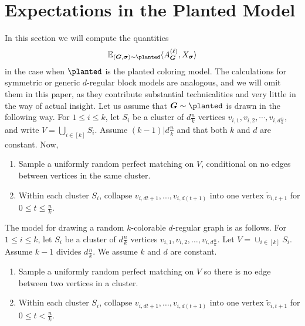 
\newcommand{\Proj}[1]{\Pi_{#1}}
\newcommand{\Symm}[1]{\mathsf{Symm}\left(#1\right)}
\newcommand{\rank}{\mathsf{rank}}


\section{Expectations in the Planted Model} \label{sec:exp-calc}

In this section we will compute the quantities
$$
    \bbE_{(\bG,\bm \sigma) \sim \planted} \langle \nb{\ell}{\bG}, X_{\bm \sigma} \rangle
$$
in the case when $\planted$ is the planted coloring model. The calculations for symmetric or generic $d$-regular block models are analogous, and we will omit them in this paper, as they contribute substantial technicalities and very little in the way of actual insight. Let us assume that $\bG \sim \planted$ is drawn in the following way. For $1 \le i \le k$, let $S_i$ be a cluster of $d\frac{n}{k}$ vertices $v_{i,1},v_{i,2},\cdots,v_{i,d\frac{n}{k}}$, and write $V = \bigcup_{i\in [k]} S_i$. Assume $(k-1)|d\frac{n}{k}$ and that both $k$ and $d$ are constant. Now,

\begin{enumerate}
    \item Sample a uniformly random perfect matching on $V$, conditional on no edges between vertices in the same cluster.
    \item Within each cluster $S_i$, collapse $v_{i,dt+1},...,v_{i,d(t+1)}$ into one vertex $\widetilde{v}_{i,t+1}$ for $0 \le t \le \frac{n}{k}$.
\end{enumerate}

The model for drawing a random $k$-colorable $d$-regular graph is as follows.  For $1\le i\le k$, let $S_i$ be a cluster of $d\frac{n}{k}$ vertices $v_{i,1}, v_{i,2}, \dots, v_{i,d\frac{n}{k}}$.  Let $V = \cup_{i\in[k]} S_i$.  Assume $k-1$ divides $d\frac{n}{k}$.  We assume $k$ and $d$ are constant.
\begin{enumerate}
\item \label{step:sample-matching} Sample a uniformly random perfect matching on $V$ so there is no edge between two vertices in a cluster.
\item \label{step:collapse} Within each cluster $S_i$, collapse $v_{i,dt+1},\dots,v_{i,d(t+1)}$ into one vertex $\widetilde{v}_{i,t+1}$ for $0\le t < \frac{n}{k}$.
\end{enumerate}


